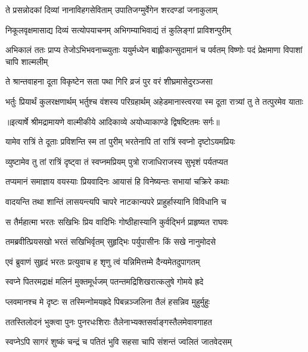 \twolineshloka
{ते प्रसन्नोदकां दिव्यां नानाविहगसेविताम्}
{उपातिजग्मुर्वेगेन शरदण्डां जनाकुलाम्} %

\twolineshloka
{निकूलवृक्षमासाद्य दिव्यं सत्योपयाचनम्}
{अभिगम्याभिवाद्यं तं कुलिङ्गां प्राविशन्पुरीम्} %

\threelineshloka
{अभिकालं ततः प्राप्य तेजोऽभिभवनाच्च्युताः}
{ययुर्मध्येन बाह्लीकान्सुदामानं च पर्वतम्}
{विष्णोः पदं प्रेक्षमाणा विपाशां चापि शाल्मलीम्} %

\twolineshloka
{ते श्रान्तवाहना दूता विकृष्टेन सता पथा}
{गिरि व्रजं पुर वरं शीघ्रमासेदुरञ्जसा} %

\fourlineindentedshloka
{भर्तुः प्रियार्थं कुलरक्षणार्थम्}
{भर्तुश्च वंशस्य परिग्रहार्थम्}
{अहेडमानास्त्वरया स्म दूता}
{रात्र्यां तु ते तत्पुरमेव याताः} %


{॥इत्यार्षे श्रीमद्रामायणे वाल्मीकीये आदिकाव्ये अयोध्याकाण्डे द्विषष्टितमः सर्गः॥}


\twolineshloka
{यामेव रात्रिं ते दूताः प्रविशन्ति स्म तां पुरीम्}
{भरतेनापि तां रात्रिं स्वप्नो दृष्टोऽयमप्रियः} %

\twolineshloka
{व्युष्टामेव तु तां रात्रिं दृष्ट्वा तं स्वप्नमप्रियम्}
{पुत्रो राजाधिराजस्य सुभृशं पर्यतप्यत} %

\twolineshloka
{तप्यमानं समाज्ञाय वयस्याः प्रियवादिनः}
{आयासं हि विनेष्यन्तः सभायां चक्रिरे कथाः} %

\twolineshloka
{वादयन्ति तथा शान्तिं लासयन्त्यपि चापरे}
{नाटकान्यपरे प्राहुर्हास्यानि विविधानि च} %

\twolineshloka
{स तैर्महात्मा भरतः सखिभिः प्रिय वादिभिः}
{गोष्ठीहास्यानि कुर्वद्भिर्न प्राहृष्यत राघवः} %

\twolineshloka
{तमब्रवीत्प्रियसखो भरतं सखिभिर्वृतम्}
{सुहृद्भिः पर्युपासीनः किं सखे नानुमोदसे} %

\twolineshloka
{एवं ब्रुवाणं सुहृदं भरतः प्रत्युवाच ह}
{शृणु त्वं यन्निमित्तम्मे दैन्यमेतदुपागतम्} %

\twolineshloka
{स्वप्ने पितरमद्राक्षं मलिनं मुक्तमूर्धजम्}
{पतन्तमद्रिशिखरात्कलुषे गोमये ह्रदे} %

\twolineshloka
{प्लवमानश्च मे दृष्टः स तस्मिन्गोमयह्रदे}
{पिबन्नञ्जलिना तैलं हसन्निव मुहुर्मुहुः} %

\twolineshloka
{ततस्तिलोदनं भुक्त्वा पुनः पुनरधःशिराः}
{तैलेनाभ्यक्तसर्वाङ्गस्तैलमेवावगाहत} %

\twolineshloka
{स्वप्नेऽपि सागरं शुष्कं चन्द्रं च पतितं भुवि}
{सहसा चापि संशन्तं ज्वलितं जातवेदसम्} %

